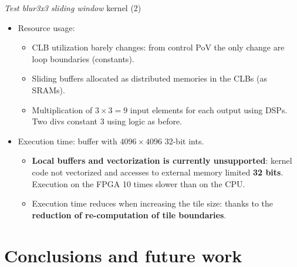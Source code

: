 \documentclass[8pt,a4paper,oneside,hidelinks,aspectratio=169,dvipsnames]{beamer}
\begin{document}
\begin{frame}{\textit{Test blur3x3 sliding window} kernel (2)}
  \begin{itemize}
    \item Resource usage:
          \begin{table}[Ht]
            \makebox[\linewidth]{
              \scalebox{.4}{}
              \scalebox{.4}{}
              \scalebox{.4}{}
              \scalebox{.4}{}
              \scalebox{.4}{}
            }
          \end{table}
          \begin{itemize}
            \item CLB utilization barely changes: from control PoV the only change are loop boundaries (constants).
            \item Sliding buffers allocated as distributed memories in the CLBs (as SRAMs).
            \item Multiplication of $3\times 3 = 9$ input elements for each output using DSPs. Two divs constant $3$ using logic as before.
          \end{itemize}
    \item Execution time: buffer with $4096 \times 4096$ 32-bit ints.
          \begin{table}[H]
            \centering
            \scalebox{.333}{}
          \end{table}
          \begin{itemize}
            \item \textbf{Local buffers and vectorization is currently unsupported}: kernel code not vectorized and accesses to external memory limited \textbf{32 bits}. Execution on the FPGA 10 times slower than on the CPU.
            \item Execution time reduces when increasing the tile size: thanks to the \textbf{reduction of re-computation of tile boundaries}.
          \end{itemize}
  \end{itemize}
\end{frame}

\section{Conclusions and future work}
\end{document}
